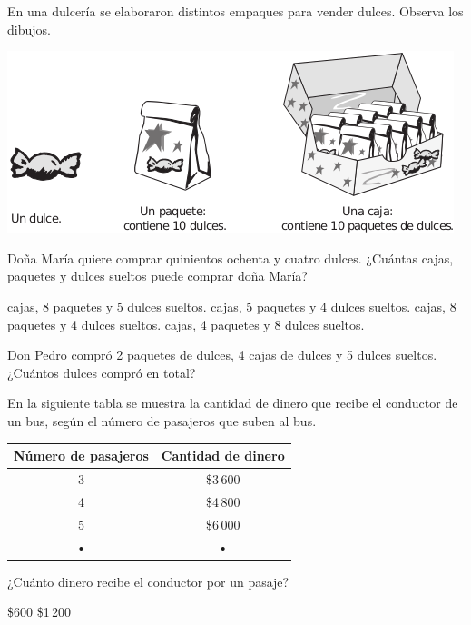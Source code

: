 \documentclass[10pt,letterpaper,addpoints]{exam}
\begin{document}
\begin{multicols}{2}
\begin{questions}
{En una dulcería se elaboraron distintos empaques para vender dulces. Observa los dibujos.
\begin{center}
\includegraphics[scale=.5]{Images/dulces.png} 
\end{center}
}
\question \label{q-02}
Doña María quiere comprar quinientos ochenta y cuatro dulces. ¿Cuántas cajas, paquetes y dulces sueltos puede comprar doña María?
\begin{choices}
 cajas, 8 paquetes y 5 dulces sueltos.
 cajas, 5 paquetes y 4 dulces sueltos.
 cajas, 8 paquetes y 4 dulces sueltos.
 cajas, 4 paquetes y 8 dulces sueltos.
\end{choices}
\question \label{q-03}
Don Pedro compró 2 paquetes de dulces, 4 cajas de dulces y 5 dulces sueltos. ¿Cuántos dulces compró en total?
\begin{multicols}{2}
\begin{choices}
\end{choices}
\end{multicols}
\question En la siguiente tabla se muestra la cantidad de dinero que recibe el conductor de un bus, según el número de pasajeros que suben al bus.
\begin{center}
\begin{tabular}{|c|c|}
\hline 
\textbf{Número de pasajeros} & \textbf{Cantidad de dinero} \\ 
\hline 
3 & \$3\,600 \\ 
\hline 
4 & \$4\,800 \\ 
\hline 
5 & \$6\,000 \\ 
\hline 
• & • \\ 
\hline 
\end{tabular} 
\end{center}
¿Cuánto dinero recibe el conductor por un pasaje?
\begin{multicols}{2}
\begin{choices}
\choice \$600
\CorrectChoice \$1\,200

\end{choices}
\end{multicols}
\end{questions}
\end{multicols}
\end{document}
